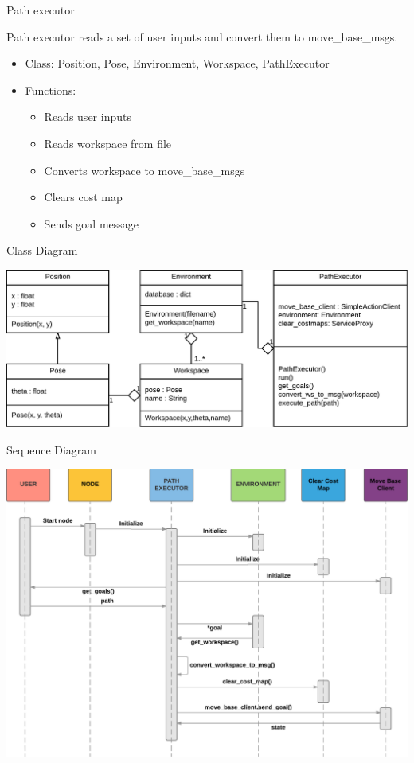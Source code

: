 \begin{frame}{Path executor}
    
    Path executor reads  a set of user inputs and convert them to move\_base\_msgs.
    \begin{itemize}
        \item Class: Position, Pose, Environment, Workspace, PathExecutor
        
        \item Functions:
        \begin{itemize}
        	\item Reads user inputs
        	\item Reads workspace from file
            \item Converts workspace to move\_base\_msgs
            \item Clears cost map
            \item Sends goal message
        \end{itemize}
    \end{itemize}
    
\end{frame}

\begin{frame}{Class Diagram}
    \begin{center}
        \includegraphics[width=\linewidth,height=\textheight,keepaspectratio]{gfx/01.pdf}
    \end{center}
\end{frame}


\begin{frame}{Sequence Diagram}
    \begin{center}
        \includegraphics[width=\linewidth,height=0.9\textheight,keepaspectratio]{gfx/02.pdf}
    \end{center}
\end{frame}